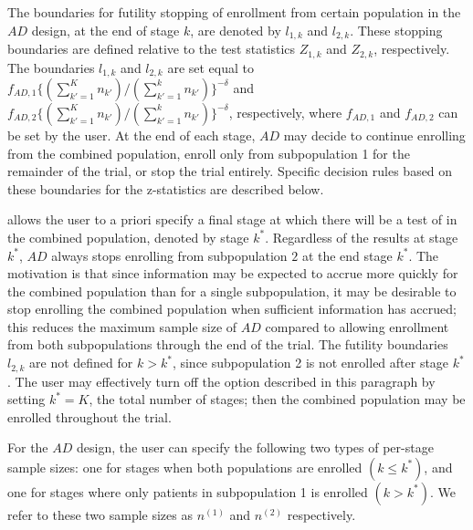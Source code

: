 \documentclass[article]{jss}
\begin{document}

The boundaries for futility stopping of enrollment from certain population in the $AD$ design, at the end of stage $k$, are denoted by $l_{1,k}$ and $l_{2,k}$. These stopping boundaries are defined relative to the test statistics $Z_{1,k}$ and $Z_{2,k}$, respectively. The boundaries $l_{1,k}$ and $l_{2,k}$ are set equal to $f_{AD,1}\{(\sum_{k'=1}^{K} n_{k'})/(\sum_{k'=1}^{k}n_{k'})\}^{-δ}$ and $ f_{AD,2}\{(\sum_{k'=1}^{K} n_{k'})/(\sum_{k'=1}^{k}n_{k'})\}^{-δ}$, respectively, where $f_{AD,1}$ and $f_{AD,2}$ can be set by the user. At the end of each stage, $AD$ may decide to continue enrolling from the combined population, enroll only from subpopulation 1 for the remainder of the trial, or stop the trial entirely.  Specific decision rules based on these boundaries for the z-statistics are described below. %


 allows the user to a priori specify a final stage  at which there will be a test of  in the combined population, denoted by stage $k^*$. Regardless of the results at stage $k^*$, $AD$ always stops enrolling from subpopulation $2$ at the end stage $k^*$. The motivation is that since information may be expected to accrue more quickly for the combined population than for a single subpopulation, it may be desirable to stop enrolling the combined population when sufficient information has accrued; this reduces the maximum sample size of $AD$ compared to allowing enrollment from both subpopulations through the end of the trial.
The futility boundaries $l_{2,k}$ are not defined for $k>k^*$, since subpopulation 2 is not enrolled after stage $k^*$. 
The user may effectively turn off the option described in this paragraph by setting $k^*=K$, the total number of stages; then the combined population may be enrolled throughout the trial.

For the $AD$ design, the user can specify the following two types of per-stage sample sizes: one for stages when both populations are enrolled $(k \leq k^*)$, and one for stages where only patients in subpopulation 1 is enrolled $(k > k^*)$. We refer to these two sample sizes as $n^{(1)}$ and $n^{(2)}$ respectively.
\end{document}
